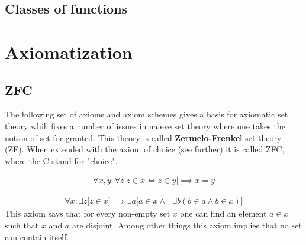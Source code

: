 \subsection{Classes of functions}

    
\section{Axiomatization}
\subsection{ZFC}

	The following set of axioms and axiom schemes gives a basis for axiomatic set theory whih fixes a number of issues in naieve set theory where one takes the notion of set for granted. This theory is called \textbf{Zermelo-Frenkel} set theory (ZF). When extended with the axiom of choice (see further) it is called ZFC, where the C stand for "choice".
	
	\begin{axiom}[Extensionality]
		\begin{gather}
			\forall x, y:\forall z\big[z\in x \iff z\in y\big]\implies x=y
		\end{gather}
	\end{axiom}
	
	\begin{axiom}[Regularity]
		\begin{gather}
			\forall x:\exists z\big[z\in x\big]\implies \exists a\big[a\in x \land \neg\exists b(b\in a \land b\in x)\big]
		\end{gather}
		This axiom says that for every non-empty set $x$ one can find an element $a\in x$ such that $x$ and $a$ are disjoint. Among other things this axiom implies that no set can contain itself.
	\end{axiom}
	
